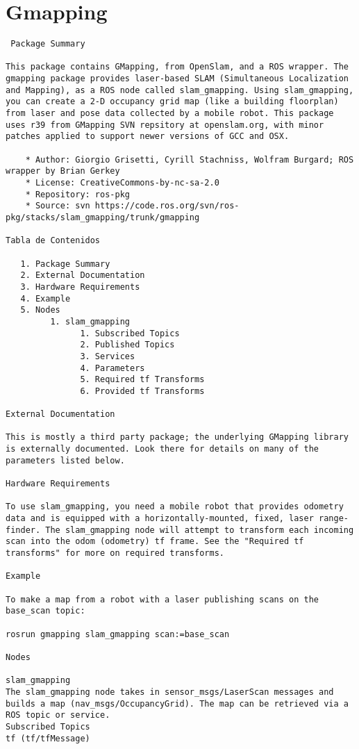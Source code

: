 \chapter{Gmapping}

\begin{verbatim}
 Package Summary

This package contains GMapping, from OpenSlam, and a ROS wrapper. The gmapping package provides laser-based SLAM (Simultaneous Localization and Mapping), as a ROS node called slam_gmapping. Using slam_gmapping, you can create a 2-D occupancy grid map (like a building floorplan) from laser and pose data collected by a mobile robot. This package uses r39 from GMapping SVN repsitory at openslam.org, with minor patches applied to support newer versions of GCC and OSX.

    * Author: Giorgio Grisetti, Cyrill Stachniss, Wolfram Burgard; ROS wrapper by Brian Gerkey
    * License: CreativeCommons-by-nc-sa-2.0
    * Repository: ros-pkg
    * Source: svn https://code.ros.org/svn/ros-pkg/stacks/slam_gmapping/trunk/gmapping

Tabla de Contenidos

   1. Package Summary
   2. External Documentation
   3. Hardware Requirements
   4. Example
   5. Nodes
         1. slam_gmapping
               1. Subscribed Topics
               2. Published Topics
               3. Services
               4. Parameters
               5. Required tf Transforms
               6. Provided tf Transforms

External Documentation

This is mostly a third party package; the underlying GMapping library is externally documented. Look there for details on many of the parameters listed below.

Hardware Requirements

To use slam_gmapping, you need a mobile robot that provides odometry data and is equipped with a horizontally-mounted, fixed, laser range-finder. The slam_gmapping node will attempt to transform each incoming scan into the odom (odometry) tf frame. See the "Required tf transforms" for more on required transforms.

Example

To make a map from a robot with a laser publishing scans on the base_scan topic:

rosrun gmapping slam_gmapping scan:=base_scan

Nodes

slam_gmapping
The slam_gmapping node takes in sensor_msgs/LaserScan messages and builds a map (nav_msgs/OccupancyGrid). The map can be retrieved via a ROS topic or service.
Subscribed Topics
tf (tf/tfMessage)


\end{verbatim}
